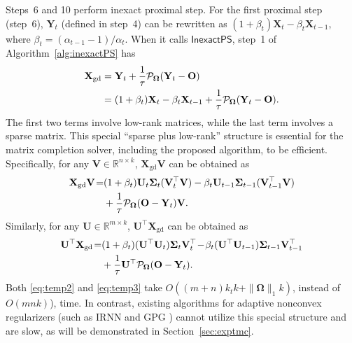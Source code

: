 \documentclass[10pt,journal,compsoc]{IEEEtran}
\def \R{\mathbb R}
\newcommand{\X}{\mathbf{X}}
\newcommand{\NM}[2]{\| #1 \|_{#2} }
\newcommand{\SO}[1]{\mathcal{P}_{\mathbf{\Omega}}(#1)}
\begin{document}
Steps~6 and 10 perform inexact proximal step. For the first proximal step
(step~6),
$\mathbf{Y}_t$ (defined in step~4) can be rewritten as $( 1 + \beta_t ) \X_t - \beta_t \X_{t - 1}$,
where $\beta_t = (\alpha_{t - 1} - 1)/\alpha_t$.
When it calls $\textsf{InexactPS}$,
step~1
of Algorithm~\ref{alg:inexactPS} has
\begin{align}
\X_{\text{gd}}
& = \mathbf{Y}_t + \frac{1}{\tau} \SO{\mathbf{Y}_t- \mathbf{O}}
\notag \\
& = (1 + \beta_t) \X_t - \beta_t \X_{t - 1}
+ \frac{1}{\tau} \SO{\mathbf{Y}_t - \mathbf{O}}.
\label{eq:zt}
\end{align}
The first two terms
involve low-rank matrices, while the last term
involves a sparse matrix.
This special ``sparse plus low-rank'' structure 
\cite{mazumder2010spectral}
is essential for the
matrix completion solver,
including the proposed algorithm,
to be efficient.
Specifically,
for any $\mathbf{V} \in \R^{n \times k}$,
$\X_{\text{gd}} \mathbf{V}$ 
can be obtained as
\begin{align}
\X_{\text{gd}} \mathbf{V}
\! = & (1 + \beta_t) \mathbf{U}_t \mathbf{\Sigma}_t (\mathbf{V}_t^{\top} \mathbf{V}) 
- \beta_t \mathbf{U}_{t - 1} \mathbf{\Sigma}_{t - 1} (\mathbf{V}_{t - 1}^{\top} \mathbf{V}) 
\notag \\
& + \frac{1}{\tau}\SO{\mathbf{O} - \mathbf{Y}_t} \mathbf{V}.
\label{eq:temp2}
\end{align}
Similarly,
for any $\mathbf{U} \in \R^{m \times k}$,
$\mathbf{U}^{\top} \X_{\text{gd}}$ 
can be obtained as
\begin{align}
\mathbf{U}^{\top} \X_{\text{gd}}
\! = & (1 + \beta_t) (\mathbf{U}^{\top} \mathbf{U}_t) \mathbf{\Sigma}_t \mathbf{V}_t^{\top} 
\! - \! \beta_t (\mathbf{U}^{\top} \mathbf{U}_{t - 1}) \mathbf{\Sigma}_{t - 1} \mathbf{V}_{t - 1}^{\top} 
\notag \\
& + \frac{1}{\tau} \mathbf{U}^{\top} \SO{\mathbf{O} - \mathbf{Y}_t}.
\label{eq:temp3}
\end{align}
Both \eqref{eq:temp2} and \eqref{eq:temp3} take $O((m + n) k_t k +
\NM{\mathbf{\Omega}}{1} k)$,
instead of $O(m n k)$),
time.
In contrast, existing algorithms for adaptive nonconvex regularizers (such as
\textsf{IRNN} \cite{lu2016nonconvex} and \textsf{GPG} \cite{lu2015generalized}) cannot utilize this special structure
and are slow, as will be demonstrated in Section~\ref{sec:exptmc}.
\end{document}
